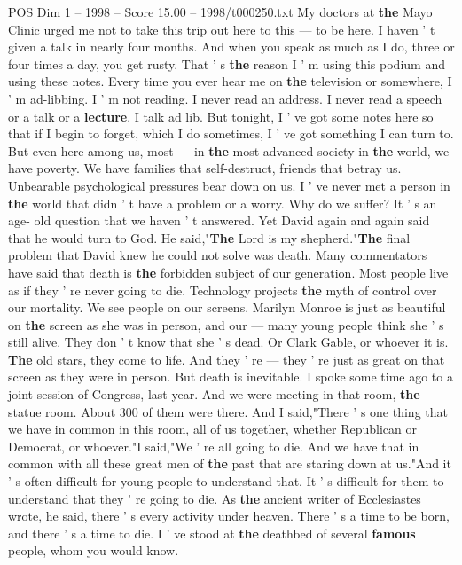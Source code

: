 \begin{textsample}{POS Dim 1 – 1998 – Score 15.00 – 1998/t000250.txt}
My doctors at \textbf{the} Mayo Clinic urged me not to take this trip out here to this — to be here.
I haven ' t given a talk in nearly four months.
And when you speak as much as I do, three or four times a day, you get rusty.
That ' s \textbf{the} reason I ' m using this podium and using these notes.
Every time you ever hear me on \textbf{the} television or somewhere, I ' m ad-libbing.
I ' m not reading.
I never read an address.
I never read a speech or a talk or a \textbf{lecture}.
I talk ad lib.
But tonight, I ' ve got some notes here so that if I begin to forget, which I do sometimes, I ' ve got something I can turn to.
But even here among us, most — in \textbf{the} most advanced society in \textbf{the} world, we have poverty.
We have families that self-destruct, friends that betray us.
Unbearable psychological pressures bear down on us.
I ' ve never met a person in \textbf{the} world that didn ' t have a problem or a worry.
Why do we suffer?
It ' s an age- old question that we haven ' t answered.
Yet David again and again said that he would turn to God.
He said,"\textbf{The} Lord is my shepherd."\textbf{The} final problem that David knew he could not solve was death.
Many commentators have said that death is \textbf{the} forbidden subject of our generation.
Most people live as if they ' re never going to die.
Technology projects \textbf{the} myth of control over our mortality.
We see people on our screens.
Marilyn Monroe is just as beautiful on \textbf{the} screen as she was in person, and our — many young people think she ' s still alive.
They don ' t know that she ' s dead.
Or Clark Gable, or whoever it is. \textbf{The} old stars, they come to life.
And they ' re — they ' re just as great on that screen as they were in person.
But death is inevitable.
I spoke some time ago to a joint session of Congress, last year.
And we were meeting in that room, \textbf{the} statue room.
About 300 of them were there.
And I said,"There ' s one thing that we have in common in this room, all of us together, whether Republican or Democrat, or whoever."I said,"We ' re all going to die.
And we have that in common with all these great men of \textbf{the} past that are staring down at us."And it ' s often difficult for young people to understand that.
It ' s difficult for them to understand that they ' re going to die.
As \textbf{the} ancient writer of Ecclesiastes wrote, he said, there ' s every activity under heaven.
There ' s a time to be born, and there ' s a time to die.
I ' ve stood at \textbf{the} deathbed of several \textbf{famous} people, whom you would know.

\end{textsample}
